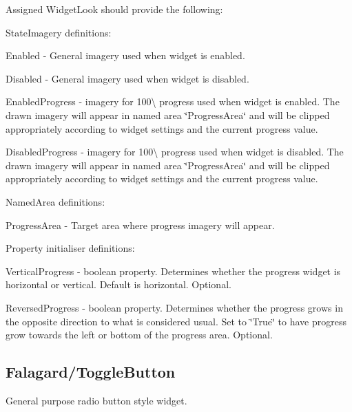 Assigned Widget\+Look should provide the following\+: 
\begin{DoxyItemize}
\item State\+Imagery definitions\+: 
\begin{DoxyItemize}
\item Enabled -\/ General imagery used when widget is enabled. 
\item Disabled -\/ General imagery used when widget is disabled. 
\item Enabled\+Progress -\/ imagery for 100\textbackslash{} progress used when widget is enabled. The drawn imagery will appear in named area \char`\"{}\+Progress\+Area\char`\"{} and will be clipped appropriately according to widget settings and the current progress value. 
\item Disabled\+Progress -\/ imagery for 100\textbackslash{} progress used when widget is disabled. The drawn imagery will appear in named area \char`\"{}\+Progress\+Area\char`\"{} and will be clipped appropriately according to widget settings and the current progress value. 
\end{DoxyItemize}


\item Named\+Area definitions\+: 
\begin{DoxyItemize}
\item Progress\+Area -\/ Target area where progress imagery will appear. 
\end{DoxyItemize}


\item Property initialiser definitions\+: 
\begin{DoxyItemize}
\item Vertical\+Progress -\/ boolean property. Determines whether the progress widget is horizontal or vertical. Default is horizontal. Optional. 
\item Reversed\+Progress -\/ boolean property. Determines whether the progress grows in the opposite direction to what is considered \textquotesingle{}usual\textquotesingle{}. Set to \char`\"{}\+True\char`\"{} to have progress grow towards the left or bottom of the progress area. Optional. 
\end{DoxyItemize}
\end{DoxyItemize}\hypertarget{fal_wr_ref_fal_wr_ref_sec_16}{}\subsection{Falagard/\+Toggle\+Button}\label{fal_wr_ref_fal_wr_ref_sec_16}
General purpose radio button style widget.

